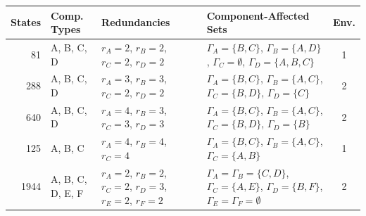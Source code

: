 \documentclass[12pt]{article}
\begin{document}
\begin{table}
\centering
    \begin{tabular}{|r|l|p{3cm}|p{5cm}|c|}
    \hline
	    States & Comp. Types & Redundancies
& Component-Affected Sets & Env. \\ \hline
	
	    81 & A, B, C, D & $r_A = 2$, $r_B = 2$, \newline $r_C = 2$, $r_D = 2$ &
	    $\Gamma_{A} = \{B, C\}$, $\Gamma_{B} = \{A, D\}$, \newline $\Gamma_{C} =
	    \emptyset$, $\Gamma_{D} = \{A, B, C\}$ & 1 \\ \hline
	
	    288 & A, B, C, D & $r_A = 3$, $r_B = 3$, \newline $r_C = 2$, $r_D = 2$ &
	    $\Gamma_{A} = \{B, C\}$, $\Gamma_{B} = \{A, C\}$, \newline $\Gamma_{C} =
	    \{B, D\}$, $\Gamma_{D} = \{C\}$ & 2 \\ \hline

	    640 & A, B, C, D & $r_A = 4$, $r_B = 3$, \newline $r_C = 3$, $r_D = 3$ &
	    $\Gamma_{A} = \{B, C\}$, $\Gamma_{B} = \{A, C\}$, \newline $\Gamma_{C} =
	    \{B, D\}$, $\Gamma_{D} = \{B\}$ & 2 \\ \hline
	
	    125 & A, B, C & $r_A = 4$, $r_B = 4$, \newline $r_C = 4$ & $\Gamma_{A} =
	    \{B, C\}$, $\Gamma_{B} = \{A, C\}$, \newline $\Gamma_{C} = \{A, B\}$ & 1
	    \\ \hline

	    1944 & A, B, C, D, E, F & $r_A = 2$, $r_B = 2$, \newline $r_C = 2$, $r_D
	    = 3$, \newline $r_E = 2$, $r_F = 2$ & $\Gamma_{A} = \Gamma_{B} = \{C,
	    D\} $, \newline $\Gamma_{C} = \{A, E\}$,  $\Gamma_{D} = \{B, F\}$,
	    \newline $\Gamma_{E} = \Gamma_{F} = \emptyset$ & 2 \\ \hline

	\end{tabular}
	\label{tab:models}
\end{table}
\end{document}
